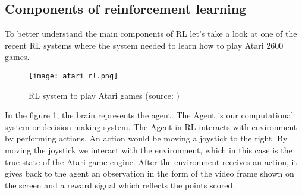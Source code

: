 

%
%
%




\subsection{Components of reinforcement learning}
To better understand the main components of RL let's take a
look at one of the recent RL systems where the system
needed to learn how to play Atari 2600 games.

\begin{figure}[H]
	\texttt{[image: atari\_rl.png]}
	\caption{
		RL system to play Atari games (source: \cite{mnih2013playing})
		}
	\label{img:atari_rl}
\end{figure}
In the figure \ref{img:atari_rl}, the brain represents the agent. The Agent is our
computational system or decision making system.
The Agent in RL interacts with environment by performing actions. An action would be moving a joystick to the right.
By moving the joystick
we interact with the environment, which in this case is the true state of the Atari game engine.
After the environment receives an action, it gives back to the agent an observation
in the form of the video frame shown on the screen
and a reward signal which reflects the points scored.
\\
